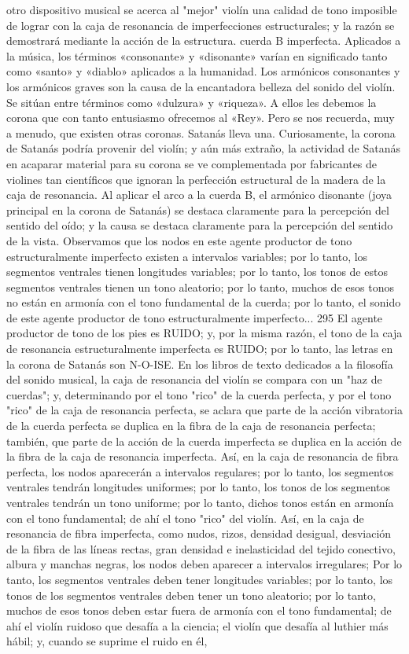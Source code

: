 otro dispositivo musical se acerca al "mejor" violín una calidad de tono imposible de lograr con la caja de resonancia de imperfecciones estructurales; y la razón se demostrará mediante la acción de la estructura.
cuerda B imperfecta.
Aplicados a la música, los términos «consonante» y «disonante» varían en significado tanto como «santo» y «diablo» aplicados a la humanidad. Los armónicos consonantes y los armónicos graves son la causa de la encantadora belleza del sonido del violín. Se sitúan entre términos como «dulzura» y «riqueza». A ellos les debemos la corona que con tanto entusiasmo ofrecemos al «Rey». Pero se nos recuerda, muy a menudo, que existen otras coronas. Satanás lleva una. Curiosamente, la corona de Satanás podría provenir del violín; y aún más extraño, la actividad de Satanás en acaparar material para su corona se ve complementada por fabricantes de violines tan científicos que ignoran la perfección estructural de la madera de la caja de resonancia.
Al aplicar el arco a la cuerda B, el armónico disonante (joya principal en la corona de Satanás) se destaca claramente para la percepción del sentido del oído; y la causa se destaca claramente para la percepción del sentido de la vista. Observamos que los nodos en este agente productor de tono estructuralmente imperfecto existen a intervalos variables; por lo tanto, los segmentos ventrales tienen longitudes variables; por lo tanto, los tonos de estos segmentos ventrales tienen un tono aleatorio; por lo tanto, muchos de esos tonos no están en armonía con el tono fundamental de la cuerda; por lo tanto, el sonido de este agente productor de tono estructuralmente imperfecto...
295
\label{tono_frio} \label{sobretonos_dis2}
El agente productor de tono de los pies es RUIDO; y, por la misma razón, el tono de la caja de resonancia estructuralmente imperfecta es RUIDO; por lo tanto, las letras en la corona de Satanás son N-O-ISE.
En los libros de texto dedicados a la filosofía del sonido musical, la caja de resonancia del violín se compara con un "haz de cuerdas"; y, determinando por el tono "rico" de la cuerda perfecta, y por el tono "rico" de la caja de resonancia perfecta, se aclara que parte de la acción vibratoria de la cuerda perfecta se duplica en la fibra de la caja de resonancia perfecta; también, que parte de la acción de la cuerda imperfecta se duplica en la acción de la fibra de la caja de resonancia imperfecta. Así, en la caja de resonancia de fibra perfecta, los nodos aparecerán a intervalos regulares; por lo tanto, los segmentos ventrales tendrán longitudes uniformes; por lo tanto, los tonos de los segmentos ventrales tendrán un tono uniforme; por lo tanto, dichos tonos están en armonía con el tono fundamental; de ahí el tono "rico" del violín. Así, en la caja de resonancia de fibra imperfecta, como nudos, rizos, densidad desigual, desviación de la fibra de las líneas rectas, gran densidad e inelasticidad del tejido conectivo, albura y manchas negras, los nodos deben aparecer a intervalos irregulares; Por lo tanto, los segmentos ventrales deben tener longitudes variables; por lo tanto, los tonos de los segmentos ventrales deben tener un tono aleatorio; por lo tanto, muchos de esos tonos deben estar fuera de armonía con el tono fundamental; de ahí el violín ruidoso que desafía a la ciencia; el violín que desafía al luthier más hábil; y, cuando se suprime el ruido en él,
